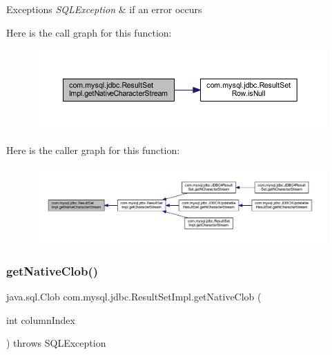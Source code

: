 \begin{DoxyExceptions}{Exceptions}
{\em S\+Q\+L\+Exception} & if an error occurs \\
\hline
\end{DoxyExceptions}
Here is the call graph for this function\+:
\nopagebreak
\begin{figure}[H]
\begin{center}
\leavevmode
\includegraphics[width=350pt]{classcom_1_1mysql_1_1jdbc_1_1_result_set_impl_aa4b4211a652d497532ff8e857c0cb7a5_cgraph}
\end{center}
\end{figure}
Here is the caller graph for this function\+:
\nopagebreak
\begin{figure}[H]
\begin{center}
\leavevmode
\includegraphics[width=350pt]{classcom_1_1mysql_1_1jdbc_1_1_result_set_impl_aa4b4211a652d497532ff8e857c0cb7a5_icgraph}
\end{center}
\end{figure}
\mbox{\label{classcom_1_1mysql_1_1jdbc_1_1_result_set_impl_af5981a9f77de2cfbdcf0fcb81de84116}} 
\subsubsection{\texorpdfstring{get\+Native\+Clob()}{getNativeClob()}}
{\footnotesize\ttfamily java.\+sql.\+Clob com.\+mysql.\+jdbc.\+Result\+Set\+Impl.\+get\+Native\+Clob (\begin{DoxyParamCaption}\item[{int}]{column\+Index }\end{DoxyParamCaption}) throws S\+Q\+L\+Exception\hspace{0.3cm}{\ttfamily [protected]}}


